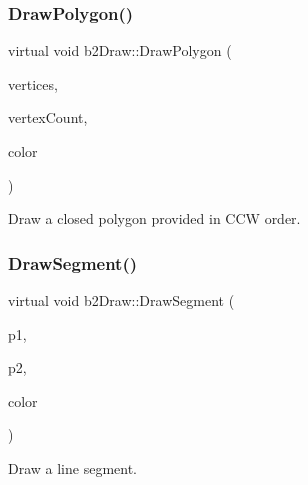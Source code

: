 \subsubsection{\texorpdfstring{DrawPolygon()}{DrawPolygon()}}
{\footnotesize\ttfamily virtual void b2\+Draw\+::\+Draw\+Polygon (\begin{DoxyParamCaption}\item[{const \mbox{\hyperlink{structb2_vec2}{b2\+Vec2}} $\ast$}]{vertices,  }\item[{\mbox{\hyperlink{b2_settings_8h_a43d43196463bde49cb067f5c20ab8481}{int32}}}]{vertex\+Count,  }\item[{const \mbox{\hyperlink{structb2_color}{b2\+Color}} \&}]{color }\end{DoxyParamCaption})\hspace{0.3cm}{\ttfamily [pure virtual]}}



Draw a closed polygon provided in C\+CW order. 

\mbox{\label{classb2_draw_a1de5aaf50db875d1c644c596832af57d}} 
\subsubsection{\texorpdfstring{DrawSegment()}{DrawSegment()}}
{\footnotesize\ttfamily virtual void b2\+Draw\+::\+Draw\+Segment (\begin{DoxyParamCaption}\item[{const \mbox{\hyperlink{structb2_vec2}{b2\+Vec2}} \&}]{p1,  }\item[{const \mbox{\hyperlink{structb2_vec2}{b2\+Vec2}} \&}]{p2,  }\item[{const \mbox{\hyperlink{structb2_color}{b2\+Color}} \&}]{color }\end{DoxyParamCaption})\hspace{0.3cm}{\ttfamily [pure virtual]}}



Draw a line segment. 

\mbox{\label{classb2_draw_a775a1d0472c5980d597904c7b596a0a6}} 
